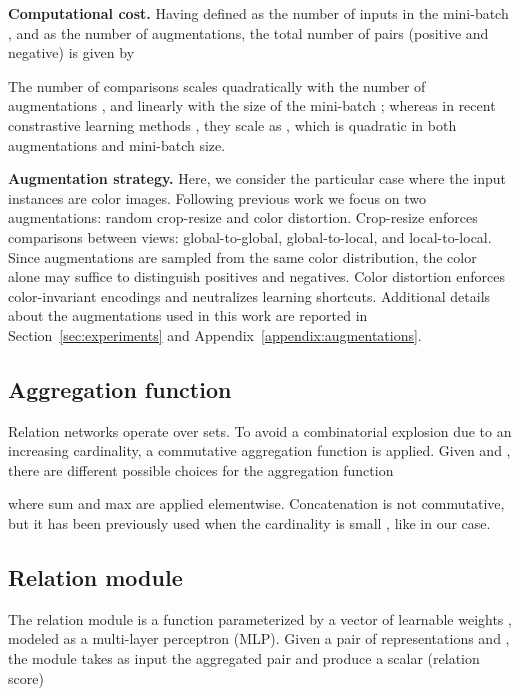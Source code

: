 \documentclass{article}
\begin{document}
\textbf{Computational cost.} Having defined  as the number of inputs in the mini-batch , and  as the number of augmentations, the total number of pairs  (positive and negative) is given by


The number of comparisons  scales quadratically with the number of augmentations , and linearly with the size of the mini-batch ; whereas in recent constrastive learning methods \citep{chen2020simple}, they scale as , which is quadratic in both augmentations and mini-batch size. 

\textbf{Augmentation strategy.}
Here, we consider the particular case where the input instances are color images. Following previous work \citep{chen2020simple} we focus on two augmentations: random crop-resize and color distortion. Crop-resize enforces comparisons between views: global-to-global, global-to-local, and local-to-local. Since augmentations are sampled from the same color distribution, the color alone may suffice to distinguish positives and negatives. Color distortion enforces color-invariant encodings and neutralizes learning shortcuts. Additional details about the augmentations used in this work are reported in Section~\ref{sec:experiments} and Appendix~\ref{appendix:augmentations}.


\subsection{Aggregation function}\label{ssec:aggregation_funciton}

Relation networks operate over sets. To avoid a combinatorial explosion due to an increasing cardinality, a commutative aggregation function is applied. Given   and , there are different possible choices for the aggregation function

where sum and max are applied elementwise. Concatenation  is not commutative, but it has been previously used when the cardinality is small \citep{hu2018relation, sung2018learning}, like in our case.


\subsection{Relation module}\label{ssec:relation_module}

The relation module is a function  parameterized by a vector of learnable weights , modeled as a multi-layer perceptron (MLP). Given a pair of representations  and , the module takes as input the aggregated pair and produce a scalar  (relation score)
\end{document}
